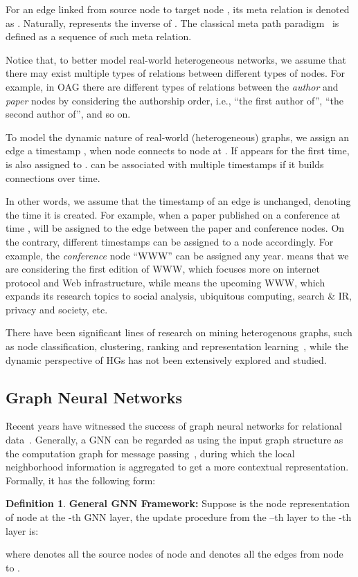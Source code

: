 \documentclass[sigconf]{acmart}
\theoremstyle{definition}
\newtheorem{defn}[theorem]{Definition}
\begin{document}
For an edge  linked from source node  to target node , its {meta relation} is denoted as . Naturally,  represents the inverse of . The classical meta path paradigm~\cite{Sun:VLDB11,DBLP:conf/kdd/SunNHYYY12, Sun:BOOK2012} is defined as a sequence of such meta relation.

Notice that, to better model real-world heterogeneous networks, we assume that there may exist multiple types of relations between different types of nodes. 
For example, in OAG there are different types of relations between the \textit{author} and \textit{paper} nodes by considering the authorship order, i.e., ``the first author of'', ``the second author of'', and so on.


To model the dynamic nature of real-world (heterogeneous) graphs, we assign an edge   a timestamp , when node  connects to node  at . 
If  appears for the first time,  is also assigned to . 
 can be associated with multiple timestamps if it builds connections over time. 

In other words, we assume that the timestamp of an edge is unchanged, denoting the time it is created. For example, when a paper published on a conference at time ,  will be assigned to the edge between the paper and conference nodes. 
On the contrary, different timestamps can be assigned to a node accordingly. 
For example, the \textit{conference} node ``WWW'' can be assigned any year.  means that we are considering the first edition of WWW, which focuses more on internet protocol and Web infrastructure, while  means the upcoming WWW, which expands its research topics to social analysis, ubiquitous computing, search \& IR, privacy and society, etc. 

There have been significant lines of research on mining heterogenous graphs, such as node classification, clustering, ranking and representation learning~\cite{Sun:BOOK2012,Sun:VLDB11,DBLP:conf/kdd/SunNHYYY12,dong2017metapath2vec}, while the dynamic perspective of HGs has not been extensively explored and studied. 



\subsection{Graph Neural Networks}
Recent years have witnessed the success of graph neural networks for relational data~\cite{gcn,gat,graphsage}. 
Generally, a GNN can be regarded as using the input graph structure as the computation graph for message passing~\cite{DBLP:conf/icml/GilmerSRVD17}, during which the local neighborhood information is aggregated to get a more contextual representation. Formally, it has the following form:
\begin{defn}{\textbf{General GNN Framework:}}
Suppose  is the node representation of node  at the -th GNN layer, the update procedure from the --th layer to the -th layer is:

where  denotes all the source nodes of node  and   denotes all the edges from node  to . 
\end{defn}
\end{document}
